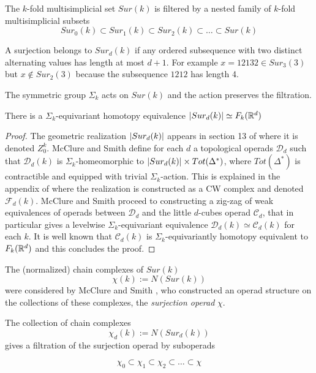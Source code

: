 The $k$-fold multisimplicial set $Sur(k)$ is filtered
by a nested family of $k$-fold multisimplicial subsets
$$Sur_0(k) \subset Sur_1(k) \subset Sur_2(k)  \subset \dots \subset Sur(k)$$

A surjection belongs to $Sur_d(k)$
if any ordered subsequence with two distinct alternating values has length at most $d+1$.
For example $x=12132 \in Sur_3(3)$ but $x \notin Sur_2(3)$ because the subsequence $1212$ has length 4. 

The symmetric group $\Sigma_k$ acts on $Sur(k)$ and the action preserves the filtration. 

\begin{proposition} \label{sur-real}
There is a $\Sigma_k$-equivariant homotopy equivalence 
$\lvert Sur_d(k)\rvert \simeq F_k(\mathbb{R}^d)$
\end{proposition}

\begin{proof}
The geometric realization $\lvert Sur_d(k)\rvert$ appears in section 13 of \cite{MS} where it is denoted $Z_0^k$. 
McClure and Smith define for each $d$ a topological operads $\mathcal{D}_d$ such that $\mathcal{D}_d(k)$ is $\Sigma_k$-homeomorphic to $\lvert Sur_d(k)\rvert \times Tot(\Delta^*)$, where $Tot(\Delta^*)$ is  contractible and equipped with trivial $\Sigma_k$-action. This is explained in the appendix of \cite{cyclic} where the realization is constructed as a CW complex and denoted $\mathcal{F}_d(k)$. 
McClure and Smith proceed to constructing a zig-zag of weak equivalences of operads between $\mathcal{D}_d$ and the little $d$-cubes operad
$\mathcal{C}_d$, that in particular gives a levelwise $\Sigma_k$-equivariant equivalence $\mathcal{D}_d(k) \simeq \mathcal{C}_d(k)$ for each $k$. It is well known that $\mathcal{C}_d(k)$ is $\Sigma_k$-equivariantly homotopy equivalent to $F_k(\mathbb{R}^d)$ and this concludes the proof.
\end{proof}




The (normalized) chain complexes
of $Sur(k)$  $$\chi(k):=N(Sur(k))$$
were considered by McClure and Smith
\cite{MS}, %
who constructed an operad structure
on the collections of these complexes, the {\it surjection operad} $\chi$.


The collection of chain complexes
$$\chi_d(k):=N(Sur_d(k))$$
gives a filtration of the surjection operad by suboperads

$$\chi_0 \subset \chi_1 \subset \chi_2 \subset  \dots \subset \chi$$

